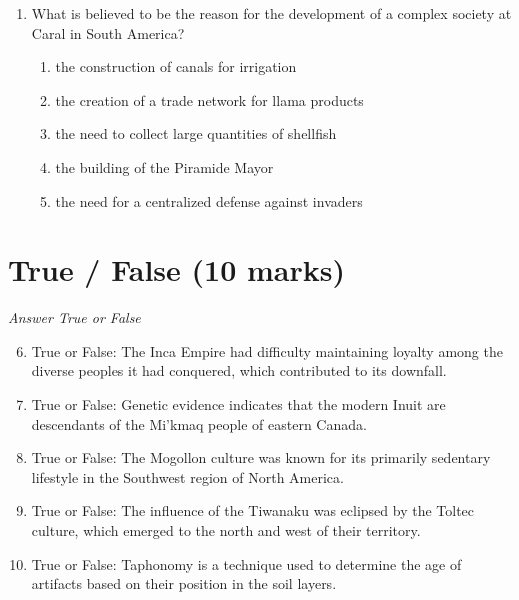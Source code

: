 \documentclass[12pt]{article}
\begin{document}
\begin{enumerate}[label=\arabic*.]
\begin{enumerate}[label=(\alph*)]
    \item gas chromatography-mass spectrometry and atomic force microscopy
    \item infrared spectroscopy and ultraviolet-visible spectroscopy
    \item Raman spectroscopy and Fourier-transform infrared spectroscopy
    \item electron microscopy and nuclear magnetic resonance
    \item gravitational wave detection and atomic absorption spectroscopy
\end{enumerate}
\item What is believed to be the reason for the development of a complex society at Caral in
South America?
\begin{enumerate}[label=(\alph*)]
    \item the construction of canals for irrigation
    \item the creation of a trade network for llama products
    \item the need to collect large quantities of shellfish
    \item the building of the Piramide Mayor
    \item the need for a centralized defense against invaders
\end{enumerate}
\end{enumerate}

\section*{True / False (10 marks)}
\textit{Answer True or False}
\begin{enumerate}[label=\arabic*.]
\setcounter{enumi}{5}
\item True or False: The Inca Empire had difficulty maintaining loyalty among the diverse peoples it had conquered, which contributed to its downfall.
\item True or False: Genetic evidence indicates that the modern Inuit are descendants of the Mi'kmaq people of eastern Canada.
\item True or False: The Mogollon culture was known for its primarily sedentary lifestyle in the Southwest region of North America.
\item True or False: The influence of the Tiwanaku was eclipsed by the Toltec culture, which emerged to the north and west of their territory.
\item True or False: Taphonomy is a technique used to determine the age of artifacts based on their position in the soil layers.
\end{enumerate}
\end{document}
